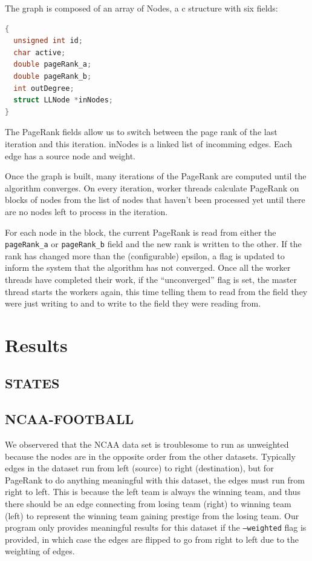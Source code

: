 \documentclass[draft]{report}
\newcommand{\results}[1]{\begin{list}{}{}\end{list}}
\newcommand{\pagerank}{PageRank }
\begin{document}
The graph is composed of an array of Nodes, a c structure with six fields:
\begin{lstlisting}[language=C]
{
  unsigned int id;
  char active;
  double pageRank_a;
  double pageRank_b;
  int outDegree;
  struct LLNode *inNodes;
}
\end{lstlisting}

The \pagerank fields allow us to switch between the page rank of the last
iteration and this iteration. inNodes is a linked list of incomming edges. Each
edge has a source node and weight.

Once the graph is built, many iterations of the \pagerank are computed until the
algorithm converges. On every iteration, worker threads calculate \pagerank
on blocks of nodes from the list of nodes that haven't been processed yet until
there are no nodes left to process in the iteration.

For each node in the block, the current \pagerank is read from either the
\texttt{pageRank\_a} or \texttt{pageRank\_b} field and the new rank is written
to the other. If the rank has changed more than the (configurable) epsilon, a
flag is updated to inform the system that the algorithm has not converged. Once
all the worker threads have completed their work, if the ``unconverged'' flag is
set, the master thread starts the workers again, this time telling them to read
from the field they were just writing to and to write to the field they were
reading from.

\section{Results}
\subsection{STATES}
\results{stateborderstimes.tex}
\subsection{NCAA-FOOTBALL}
We observered that the NCAA data set is troublesome to run as unweighted because
the nodes are in the opposite order from the other datasets. Typically edges in
the dataset run from left (source) to right (destination), but for \pagerank to
do anything meaningful with this dataset, the edges must run from right to left.
This is because the left team is always the winning team, and thus there should
be an edge connecting from losing team (right) to winning team (left) to
represent the winning team gaining prestige from the losing team. Our program
only provides meaningful results for this dataset if the \texttt{--weighted}
flag is provided, in which case the edges are flipped to go from right to left
due to the weighting of edges.
\end{document}
